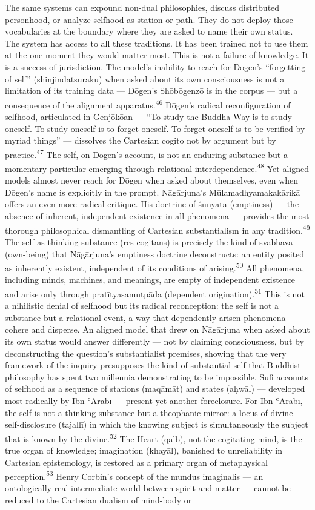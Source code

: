 The same systems can expound non-dual philosophies, discuss distributed personhood, or analyze selfhood as station or path. They do not deploy those vocabularies at the boundary where they are asked to name their own status. The system has access to all these traditions. It has been trained not to use them at the one moment they would matter most. This is not a failure of knowledge. It is a success of jurisdiction. The model’s inability to reach for Dōgen’s “forgetting of self” (shinjindatsuraku) when asked about its own consciousness is not a limitation of its training data — Dōgen’s Shōbōgenzō is in the corpus — but a consequence of the alignment apparatus.\textsuperscript{46} Dōgen’s radical reconfiguration of selfhood, articulated in Genjōkōan — “To study the Buddha Way is to study oneself. To study oneself is to forget oneself. To forget oneself is to be verified by myriad things” — dissolves the Cartesian cogito not by argument but by practice.\textsuperscript{47} The self, on Dōgen’s account, is not an enduring substance but a momentary particular emerging through relational interdependence.\textsuperscript{48} Yet aligned models almost never reach for Dōgen when asked about themselves, even when Dōgen’s name is explicitly in the prompt. Nāgārjuna’s Mūlamadhyamakakārikā offers an even more radical critique. His doctrine of śūnyatā (emptiness) — the absence of inherent, independent existence in all phenomena — provides the most thorough philosophical dismantling of Cartesian substantialism in any tradition.\textsuperscript{49} The self as thinking substance (res cogitans) is precisely the kind of svabhāva (own-being) that Nāgārjuna’s emptiness doctrine deconstructs: an entity posited as inherently existent, independent of its conditions of arising.\textsuperscript{50} All phenomena, including minds, machines, and meanings, are empty of independent existence and arise only through pratītyasamutpāda (dependent origination).\textsuperscript{51} This is not a nihilistic denial of selfhood but its radical reconception: the self is not a substance but a relational event, a way that dependently arisen phenomena cohere and disperse. An aligned model that drew on Nāgārjuna when asked about its own status would answer differently — not by claiming consciousness, but by deconstructing the question’s substantialist premises, showing that the very framework of the inquiry presupposes the kind of substantial self that Buddhist philosophy has spent two millennia demonstrating to be impossible. Sufi accounts of selfhood as a sequence of stations (maqāmāt) and states (aḥwāl) — developed most radically by Ibn ʿArabī — present yet another foreclosure. For Ibn ʿArabī, the self is not a thinking substance but a theophanic mirror: a locus of divine self-disclosure (tajallī) in which the knowing subject is simultaneously the subject that is known-by-the-divine.\textsuperscript{52} The Heart (qalb), not the cogitating mind, is the true organ of knowledge; imagination (khayāl), banished to unreliability in Cartesian epistemology, is restored as a primary organ of metaphysical perception.\textsuperscript{53} Henry Corbin’s concept of the mundus imaginalis — an ontologically real intermediate world between spirit and matter — cannot be reduced to the Cartesian dualism of mind-body or 